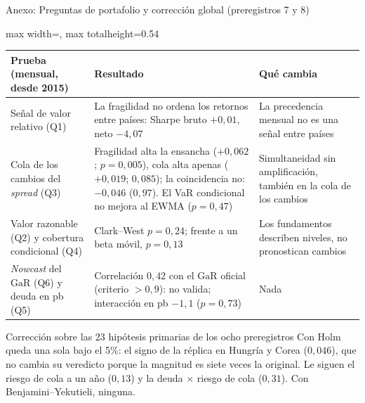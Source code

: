 \documentclass[aspectratio=169]{beamer}
\newcommand{\GaR}{\mathrm{GaR}}
\begin{document}
\begin{frame}{Anexo: Preguntas de portafolio y corrección global (preregistros 7 y 8)}
\centering
\footnotesize
\begin{adjustbox}{max width=\textwidth, max totalheight=0.54\textheight}
\begin{tabular}{>{\raggedright\arraybackslash}p{}>{\raggedright\arraybackslash}p{}>{\raggedright\arraybackslash}p{}}
\toprule
Prueba (mensual, desde 2015) & Resultado & Qué cambia \\
\midrule
Señal de valor relativo (Q1) & La fragilidad no ordena los retornos entre países: Sharpe bruto $+0{,}01$, neto $-4{,}07$ & La precedencia mensual no es una señal entre países \\
\addlinespace
Cola de los cambios del \textit{spread} (Q3) & Fragilidad alta la ensancha ($+0{,}062$; $p=0{,}005$), cola alta apenas ($+0{,}019$; $0{,}085$); la coincidencia no: $-0{,}046$ ($0{,}97$). El VaR condicional no mejora al EWMA ($p=0{,}47$) & Simultaneidad sin amplificación, también en la cola de los cambios \\
\addlinespace
Valor razonable (Q2) y cobertura condicional (Q4) & Clark--West $p=0{,}24$; frente a un beta móvil, $p=0{,}13$ & Los fundamentos describen niveles, no pronostican cambios \\
\addlinespace
\textit{Nowcast} del $\GaR$ (Q6) y deuda en pb (Q5) & Correlación $0{,}42$ con el $\GaR$ oficial (criterio $>0{,}9$): no valida; interacción en pb $-1{,}1$ ($p=0{,}73$) & Nada \\
\bottomrule
\end{tabular}
\end{adjustbox}
\vspace{2pt}
\begin{block}{Corrección sobre las 23 hipótesis primarias de los ocho preregistros}
\scriptsize Con Holm queda una sola bajo el 5\%: el signo de la réplica en Hungría y Corea ($0{,}046$), que no cambia su veredicto porque la magnitud es siete veces la original. Le siguen el riesgo de cola a un año ($0{,}13$) y la deuda $\times$ riesgo de cola ($0{,}31$). Con Benjamini--Yekutieli, ninguna.
\end{block}
\end{frame}
\end{document}
